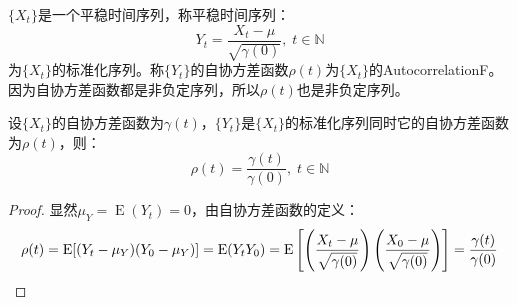 \begin{definition}
	$\{X_t\}$是一个平稳时间序列，称平稳时间序列：
	\begin{equation*}
		Y_t=\frac{X_t-\mu}{\sqrt{\gamma(0)}},\;t\in\mathbb{N}
	\end{equation*}
	为$\{X_t\}$的标准化序列。称$\{Y_t\}$的自协方差函数$\rho(t)$为$\{X_t\}$的\gls{AutocorrelationF}。因为自协方差函数都是非负定序列，所以$\rho(t)$也是非负定序列。
\end{definition}
\begin{theorem}
	设$\{X_t\}$的自协方差函数为$\gamma(t)$，$\{Y_t\}$是$\{X_t\}$的标准化序列同时它的自协方差函数为$\rho(t)$，则：
	\begin{equation*}
		\rho(t)=\frac{\gamma(t)}{\gamma(0)},\;t\in\mathbb{N}
	\end{equation*}
\end{theorem}
\begin{proof}
	显然$\mu_Y=\operatorname{E}(Y_t)=0$，由自协方差函数的定义：
	\begin{equation*}
		\rho(t)=\operatorname{E}[(Y_t-\mu_Y)(Y_0-\mu_Y)]=\operatorname{E}(Y_tY_0)=\operatorname{E}\left[\left(\frac{X_t-\mu}{\sqrt{\gamma(0)}}\right)\left(\frac{X_0-\mu}{\sqrt{\gamma(0)}}\right)\right]=\frac{\gamma(t)}{\gamma(0)}\qedhere
	\end{equation*}
\end{proof}

